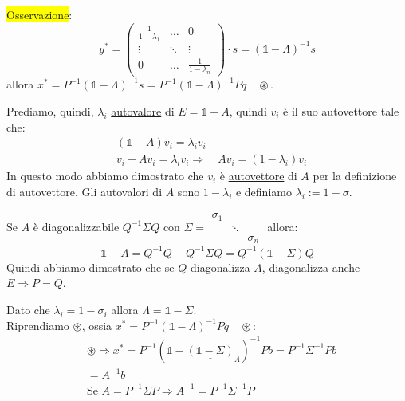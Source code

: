 \documentclass{article}
\begin{document}
\colorbox{yellow}{Osservazione}: \[y^\ast=\begin{pmatrix}
        \frac{1}{1-\lambda_1} & \dots  & 0                     \\
        \vdots                & \ddots & \vdots                \\
        0                     & \dots  & \frac{1}{1-\lambda_n}
    \end{pmatrix}\cdot s=\left(\mathbb 1-\Lambda\right)^{-1}s\]
allora $x^\ast=P^{-1}\left(\mathbb 1-\Lambda\right)^{-1}s=P^{-1}\left(\mathbb 1-\Lambda\right)^{-1}Pq\quad\circledast$.

Prediamo, quindi, $\lambda_i$ \underline{autovalore} di $E=\mathbb 1-A$, quindi $v_i$ è il suo autovettore tale che:
\begin{align*}
     & \left(\mathbb 1-A\right)v_i=\lambda_iv_i                                \\
     & v_i-Av_i=\lambda_iv_i\Rightarrow\quad Av_i=\left( 1-\lambda_i\right)v_i
\end{align*}
In questo modo abbiamo dimostrato che $v_i$ è \underline{autovettore} di $A$ per la definizione di autovettore. Gli
autovalori di $A$ sono $1-\lambda_i$ e definiamo $\lambda_i:=1-\sigma$.

Se $A$ è diagonalizzabile $Q^{-1}\Sigma Q$ con $\Sigma=\begin{smallmatrix}
        \sigma_1\\
        &\ddots\\
        &&\sigma_n
    \end{smallmatrix}$ allora:
\[\mathbb 1-A=Q^{-1}Q-Q^{-1}\Sigma Q=Q^{-1}\left(\mathbb 1-\Sigma\right)Q\]
Quindi abbiamo dimostrato che se $Q$ diagonalizza $A$, diagonalizza anche $E\Rightarrow P=Q$.

Dato che $\lambda_i=1-\sigma_i$ allora $\Lambda=\mathbb 1-\Sigma$.\\
Riprendiamo $\circledast$, ossia $x^\ast=P^{-1}\left(\mathbb 1-\Lambda\right)^{-1}Pq\quad\circledast$:
\begin{align*}
     & \circledast\Rightarrow x^\ast=P^{-1}\left(\mathbb 1-\underline{\left(\mathbb 1-\Sigma\right)}_{\Lambda}\right)^{-1}Pb=P^{-1}\Sigma^{-1}Pb \\
     & =A^{-1}b                                                                                                                                  \\
     & \text{Se }A=P^{-1}\Sigma P\Rightarrow A^{-1}=P^{-1}\Sigma^{-1}P
\end{align*}
\end{document}
